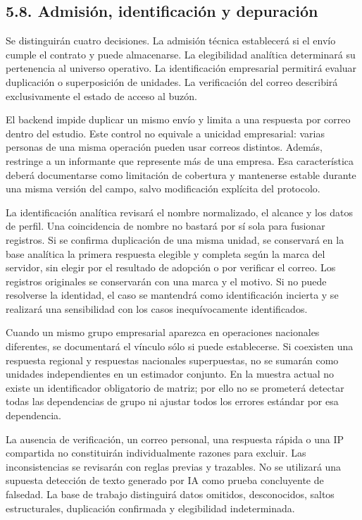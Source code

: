 \documentclass[12pt,letterpaper]{article}
\begin{document}
\subsection*{5.8. Admisión, identificación y depuración}
Se distinguirán cuatro decisiones. La admisión técnica establecerá si el envío cumple el contrato y puede almacenarse. La elegibilidad analítica determinará su pertenencia al universo operativo. La identificación empresarial permitirá evaluar duplicación o superposición de unidades. La verificación del correo describirá exclusivamente el estado de acceso al buzón.

El backend impide duplicar un mismo envío y limita a una respuesta por correo dentro del estudio. Este control no equivale a unicidad empresarial: varias personas de una misma operación pueden usar correos distintos. Además, restringe a un informante que represente más de una empresa. Esa característica deberá documentarse como limitación de cobertura y mantenerse estable durante una misma versión del campo, salvo modificación explícita del protocolo.

La identificación analítica revisará el nombre normalizado, el alcance y los datos de perfil. Una coincidencia de nombre no bastará por sí sola para fusionar registros. Si se confirma duplicación de una misma unidad, se conservará en la base analítica la primera respuesta elegible y completa según la marca del servidor, sin elegir por el resultado de adopción o por verificar el correo. Los registros originales se conservarán con una marca y el motivo. Si no puede resolverse la identidad, el caso se mantendrá como identificación incierta y se realizará una sensibilidad con los casos inequívocamente identificados.

Cuando un mismo grupo empresarial aparezca en operaciones nacionales diferentes, se documentará el vínculo sólo si puede establecerse. Si coexisten una respuesta regional y respuestas nacionales superpuestas, no se sumarán como unidades independientes en un estimador conjunto. En la muestra actual no existe un identificador obligatorio de matriz; por ello no se prometerá detectar todas las dependencias de grupo ni ajustar todos los errores estándar por esa dependencia.

La ausencia de verificación, un correo personal, una respuesta rápida o una IP compartida no constituirán individualmente razones para excluir. Las inconsistencias se revisarán con reglas previas y trazables. No se utilizará una supuesta detección de texto generado por IA como prueba concluyente de falsedad. La base de trabajo distinguirá datos omitidos, desconocidos, saltos estructurales, duplicación confirmada y elegibilidad indeterminada.
\end{document}
